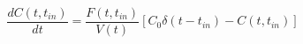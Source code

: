 \begin{equation}
\frac{dC(t,t_{in})}{dt} = \frac{F(t,t_{in})}{V(t)}[C_0\delta(t-t_{in})-C(t,t_{in})]
\end{equation}
